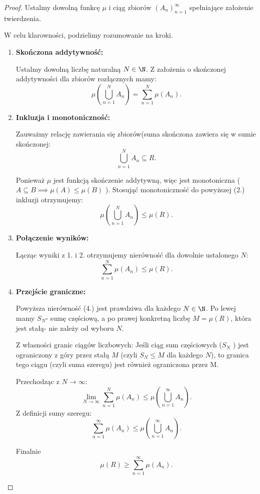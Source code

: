 \begin{proof}
	Ustalmy dowolną funkcę $\mu$ i ciąg zbiorów $\left( A_{n} \right)_{n=1}^{\infty} $ spełniające założenie twierdzenia.

	W celu klarowności, podzielimy rozumowanie na kroki.
	\begin{enumerate}[label=\arabic*.]
		\item \textbf{Skończona addytywność:}

			Ustalmy dowolną liczbę naturalną $N\in \N$. Z założenia o skończonej addytywności dla zbiorów rozłącznych mamy:
			\[
			\mu\left( \bigcup_{n=1} ^{N}A_{n} \right) = \sum_{n = 1}^{N} \mu\left( A_{n} \right) 
			.\] 
		\item \textbf{Inkluzja i monotoniczność:} 

			Zauważmy relację zawierania się zbiorów(suma skończona zawiera się w sumie skończonej:
			\[
			\bigcup_{n=1} ^{N}A_{n}\subseteq R
			.\] 

			Ponieważ $\mu$ jest funkcją skończenie addytywną, więc jest monotoniczna ($A\subseteq B \implies \mu\left( A \right) \le \mu\left( B \right) $ ). Stosująć monotoniczność do powyższej (2.) inkluzji otrzymujemy:
			\[
			\mu\left( \bigcup_{n=1} ^{N} A_{n}\right) \le \mu\left( R \right) 
			.\] 
		\item \textbf{Połączenie wyników:}

			Łącząc wyniki z 1. i 2. otrzymujemy nierówność dla dowolnie ustalonego $N$:
			 \[
			\sum_{n = 1}^{N} \mu\left( A_{n} \right) \le \mu\left( R \right) 
			.\] 
		\item \textbf{Przejście graniczne:}

			Powyższa nierówność (4.) jest prawdziwa dla każdego $N\in \N$. Po lewej mamy $S_{N}$- sumę częściową, a po prawej konkretną liczbę $M=\mu\left( R \right) $, która jest stałą- nie zależy od wyboru $N$.

			Z własności granic ciągów liczbowych: Jeśli ciąg sum częściowych ($S_{N}$ ) jest ograniczony z góry przez stałą $M$ (czyli $S_{N}\le M$ dla każdego $N$), to granica tego ciągu (czyli suma szeregu) jest również ograniczona przez M.

			Przechodząc z $N \to \infty$:
			\[
			\lim_{N \to \infty} \sum_{n=1}^{N} \mu\left( A_{n} \right) \le \mu\left( \bigcup_{n=1} ^{\infty} A_{n}\right) 
			.\] 
			Z definicji sumy szeregu:
			\[
			\sum_{n = 1}^{\infty} \mu\left( A_{n} \right) \le \mu\left( \bigcup_{n=1} ^{\infty}A_{n} \right) 
			.\] 

			Finalnie
			\[
			\mu\left( R \right) \ge \sum_{n = 1}^{\infty} \mu\left( A_{n} \right) 
			.\] 
	\end{enumerate}
\end{proof} 
